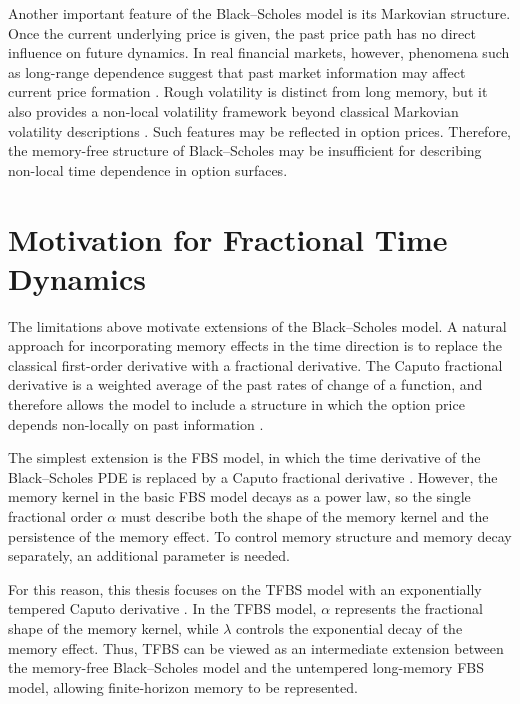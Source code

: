 \documentclass[11pt,a4paper]{report}
\begin{document}
Another important feature of the Black--Scholes model is its Markovian structure. Once the current underlying price is given, the past price path has no direct influence on future dynamics. In real financial markets, however, phenomena such as long-range dependence suggest that past market information may affect current price formation \cite{MandelbrotVanNess1968,ComteRenault1998}. Rough volatility is distinct from long memory, but it also provides a non-local volatility framework beyond classical Markovian volatility descriptions \cite{GatheralJaissonRosenbaum2018}. Such features may be reflected in option prices. Therefore, the memory-free structure of Black--Scholes may be insufficient for describing non-local time dependence in option surfaces.

\section{Motivation for Fractional Time Dynamics}

The limitations above motivate extensions of the Black--Scholes model. A natural approach for incorporating memory effects in the time direction is to replace the classical first-order derivative with a fractional derivative. The Caputo fractional derivative is a weighted average of the past rates of change of a function, and therefore allows the model to include a structure in which the option price depends non-locally on past information \cite{Podlubny1999,Caputo1967}.

The simplest extension is the FBS model, in which the time derivative of the Black--Scholes PDE is replaced by a Caputo fractional derivative \cite{Wyss2000,Magdziarz2009,CarteaDelCastilloNegrete2007}. However, the memory kernel in the basic FBS model decays as a power law, so the single fractional order $\alpha$ must describe both the shape of the memory kernel and the persistence of the memory effect. To control memory structure and memory decay separately, an additional parameter is needed.

For this reason, this thesis focuses on the TFBS model with an exponentially tempered Caputo derivative \cite{SabzikarMeerschaertChen2015}. In the TFBS model, $\alpha$ represents the fractional shape of the memory kernel, while $\lambda$ controls the exponential decay of the memory effect. Thus, TFBS can be viewed as an intermediate extension between the memory-free Black--Scholes model and the untempered long-memory FBS model, allowing finite-horizon memory to be represented.
\end{document}
